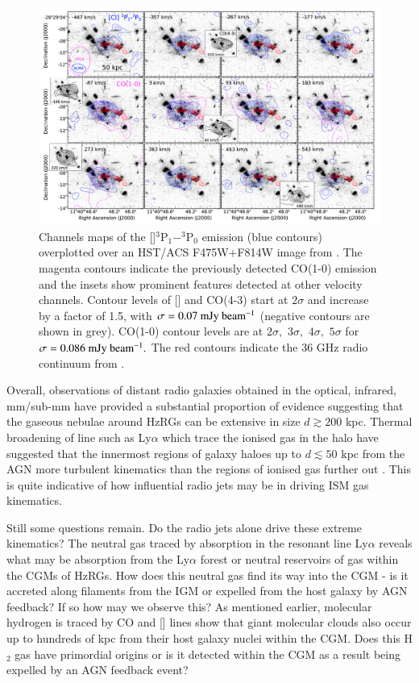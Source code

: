 \begin{figure}
 \centering
 \includegraphics[width=\textwidth]{plots_chp1/Spiderweb_glx_CI_Emonts2018.png}
 \caption[Channels maps of CO(1-0) in MRC1138-262 from \citet{emonts2018}]{Channels maps of the []$^3$P$_1-^3$P$_0$ emission (blue contours) overplotted over an HST/ACS F475W+F814W image from \citet{Miley2006}. The magenta contours indicate the previously detected CO(1-0) emission and the insets show prominent features detected at other velocity channels. Contour levels of [] and CO(4-3) start at $2\sigma$ and increase by a factor of 1.5, with $\rm \sigma=0.07~mJy~beam^{-1}$ (negative contours are shown in grey). CO(1-0) contour levels are at $2\sigma,$ $3\sigma,$ $4\sigma,$ $5\sigma$ for $\rm \sigma=0.086~mJy~beam^{-1}.$ The red contours indicate the 36 GHz radio continuum from \citet{Emonts2016}.}
 \label{fig:CI-Spiderweb-Emonts2018}
\end{figure}

Overall, observations of distant radio galaxies obtained in the optical, infrared, mm/sub-mm have provided a substantial proportion of evidence suggesting that the gaseous nebulae around HzRGs can be extensive in size $d \gtrsim 200$ kpc. Thermal broadening of line such as Ly$\alpha$ which trace the ionised gas in the halo have suggested that the innermost regions of galaxy haloes up to $d \lesssim 50$ kpc from the AGN more turbulent kinematics than the regions of ionised gas further out \citep{villar-martin2003}. This is quite indicative of how influential radio jets may be in driving ISM gas kinematics. 

Still some questions remain. Do the radio jets alone drive these extreme kinematics? The neutral gas traced by absorption in the resonant line Ly$\alpha$ reveals what may be absorption from the Ly$\alpha$ forest or neutral reservoirs of gas within the CGMs of HzRGs. How does this neutral gas find its way into the CGM - is it accreted along filaments from the IGM or expelled from the host galaxy by AGN feedback? If so how may we observe this? As mentioned earlier, molecular hydrogen is traced by CO and [] lines show that giant molecular clouds also occur up to hundreds of kpc from their host galaxy nuclei within the CGM. Does this H$_2$ gas have primordial origins or is it detected within the CGM as a result being expelled by an AGN feedback event? 

